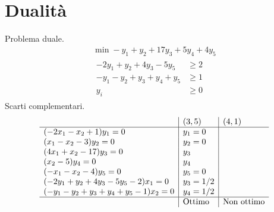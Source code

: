 \chapter{Dualità}

\Es

Problema duale.
\begin{gather*}
\min -y_{1} +y_{2} +17y_{3} +5y_{4} +4y_{5}\\
\begin{aligned}
-2y_{1} +y_{2} +4y_{3} -5y_{5} & \geq 2\\
-y_{1} -y_{2} +y_{3} +y_{4} +y_{5} & \geq 1\\
y_{i} & \geq 0
\end{aligned}
\end{gather*}
Scarti complementari.
\begin{equation*}
\begin{array}{ l|l|l }
 & ( 3,5) & ( 4,1)\\
\hline
( -2x_{1} -x_{2} +1) y_{1} =0 & y_{1} =0 & \\
( x_{1} -x_{2} -3) y_{2} =0 & y_{2} =0 & \\
( 4x_{1} +x_{2} -17) y_{3} =0 & y_{3} & \\
( x_{2} -5) y_{4} =0 & y_{4} & \\
( -x_{1} -x_{2} -4) y_{5} =0 & y_{5} =0 & \\
( -2y_{1} +y_{2} +4y_{3} -5y_{5} -2) x_{1} =0 & y_{3} =1/2 & \\
( -y_{1} -y_{2} +y_{3} +y_{4} +y_{5} -1) x_{2} =0 & y_{4} =1/2 & \\
\hline
 & \text{Ottimo} & \text{Non ottimo}
\end{array}
\end{equation*}
\Es

